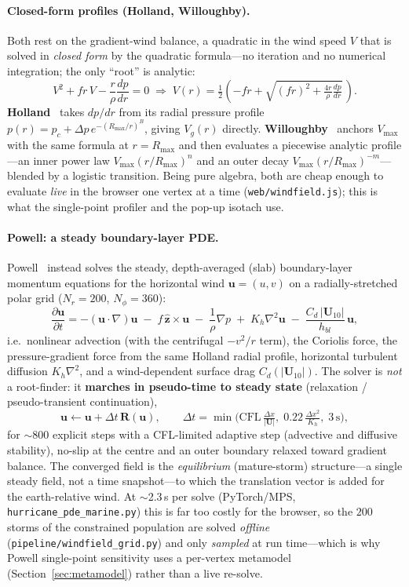 \documentclass[11pt]{article}
\begin{document}
\paragraph{Closed-form profiles (Holland, Willoughby).}
Both rest on the gradient-wind balance, a quadratic in the wind speed $V$ that is
solved in \emph{closed form} by the quadratic formula---no iteration and no
numerical integration; the only ``root'' is analytic:
\[
V^2 + f r\,V - \frac{r}{\rho}\frac{dp}{dr}=0
\;\Longrightarrow\;
V(r)=\tfrac12\!\left(-f r + \sqrt{(f r)^2 + \tfrac{4r}{\rho}\tfrac{dp}{dr}}\,\right).
\]
\textbf{Holland}~\cite{holland} takes $dp/dr$ from its radial pressure profile
$p(r)=p_c+\Delta p\,e^{-(R_{\max}/r)^B}$, giving $V_g(r)$ directly.
\textbf{Willoughby}~\cite{willoughby} anchors $V_{\max}$ with the same formula at
$r=R_{\max}$ and then evaluates a piecewise analytic profile---an inner power law
$V_{\max}(r/R_{\max})^{n}$ and an outer decay $V_{\max}(r/R_{\max})^{-m}$---blended
by a logistic transition. Being pure algebra, both are cheap enough to evaluate
\emph{live} in the browser one vertex at a time (\texttt{web/windfield.js}); this is
what the single-point profiler and the pop-up isotach use.

\paragraph{Powell: a steady boundary-layer PDE.}
Powell~\cite{powell,vickery} instead solves the steady, depth-averaged (slab)
boundary-layer momentum equations for the horizontal wind $\mathbf u=(u,v)$ on a
radially-stretched polar grid ($N_r=200$, $N_\phi=360$):
\[
\frac{\partial \mathbf u}{\partial t}
= -(\mathbf u\!\cdot\!\nabla)\mathbf u
  \;-\; f\,\hat{\mathbf z}\times\mathbf u
  \;-\; \frac{1}{\rho}\nabla p
  \;+\; K_h\nabla^2\mathbf u
  \;-\; \frac{C_d\,|\mathbf U_{10}|}{h_{bl}}\,\mathbf u ,
\]
i.e.\ nonlinear advection (with the centrifugal $-v^2/r$ term), the Coriolis force,
the pressure-gradient force from the same Holland radial profile, horizontal
turbulent diffusion $K_h\nabla^2$, and a wind-dependent surface drag
$C_d(|\mathbf U_{10}|)$. The solver is \emph{not} a root-finder: it \textbf{marches
in pseudo-time to steady state} (relaxation / pseudo-transient continuation),
\[
\mathbf u \leftarrow \mathbf u + \Delta t\,\mathbf R(\mathbf u),\qquad
\Delta t=\min\!\Big(\text{CFL}\,\tfrac{\Delta x}{|\mathbf U|},\;
0.22\,\tfrac{\Delta x^2}{K_h},\;3\,\text{s}\Big),
\]
for $\sim$800 explicit steps with a CFL-limited adaptive step (advective and
diffusive stability), no-slip at the centre and an outer boundary relaxed toward
gradient balance. The converged field is the \emph{equilibrium} (mature-storm)
structure---a single steady field, not a time snapshot---to which the translation
vector is added for the earth-relative wind. At $\sim$2.3\,s per solve (PyTorch/MPS,
\texttt{hurricane\_pde\_marine.py}) this is far too costly for the browser, so the
$200$ storms of the constrained population are solved \emph{offline}
(\texttt{pipeline/windfield\_grid.py}) and only \emph{sampled} at run time---which is
why Powell single-point sensitivity uses a per-vertex metamodel
(Section~\ref{sec:metamodel}) rather than a live re-solve.
\end{document}
